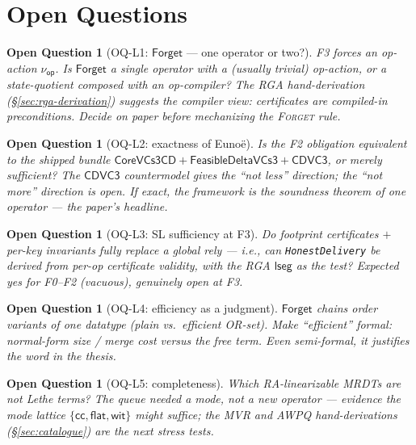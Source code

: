 \documentclass[11pt]{article}
\newtheorem{openq}[theorem]{Open Question}
\newcommand{\co}{\mathsf{CoreVCs3CD}}
\newcommand{\fd}{\mathsf{FeasibleDeltaVCs3}}
\newcommand{\cd}{\mathsf{CDVC3}}
\newcommand{\lean}[1]{\texttt{#1}}
\newcommand{\Forget}{\mathsf{Forget}}
\newcommand{\lseg}{\mathsf{lseg}}
\newcommand{\nuop}{\nu_{\mathsf{op}}}
\newcommand{\cc}{\mathsf{cc}}
\renewcommand{\flat}{\mathsf{flat}}
\newcommand{\wit}{\mathsf{wit}}
\begin{document}
\section{Open Questions}\label{sec:oq}

\begin{openq}[OQ-L1: $\Forget$ --- one operator or two?]\label{oq:onetwo}
F3 forces an op-action $\nuop$. Is $\Forget$ a single operator with a
(usually trivial) op-action, or a state-quotient composed with an
\emph{op-compiler}? The RGA hand-derivation (\S\ref{sec:rga-derivation})
suggests the compiler view: certificates are compiled-in preconditions.
Decide on paper before mechanizing the \textsc{Forget} rule.
\end{openq}

\begin{openq}[OQ-L2: exactness of Euno\"e]\label{oq:exact}
Is the F2 obligation \emph{equivalent} to the shipped bundle
$\co + \fd + \cd$, or merely sufficient? The $\cd$ countermodel gives the
``not less'' direction; the ``not more'' direction is open. If exact, the
framework \emph{is} the soundness theorem of one operator --- the paper's
headline.
\end{openq}

\begin{openq}[OQ-L3: SL sufficiency at F3]\label{oq:sl}
Do footprint certificates $+$ per-key invariants fully replace a global
rely --- i.e., can \lean{HonestDelivery} be \emph{derived} from per-op
certificate validity, with the RGA $\lseg$ as the test? Expected yes for
F0--F2 (vacuous), genuinely open at F3.
\end{openq}

\begin{openq}[OQ-L4: efficiency as a judgment]\label{oq:eff}
$\Forget$ chains order variants of one datatype (plain vs.\ efficient
OR-set). Make ``efficient'' formal: normal-form size / merge cost versus
the free term. Even semi-formal, it justifies the word in the thesis.
\end{openq}

\begin{openq}[OQ-L5: completeness]\label{oq:complete}
Which RA-linearizable MRDTs are \emph{not} Lethe terms? The queue needed a
mode, not a new operator --- evidence the mode lattice
$\{\cc, \flat, \wit\}$ might suffice; the MVR and AWPQ hand-derivations
(\S\ref{sec:catalogue}) are the next stress tests.
\end{openq}
\end{document}
